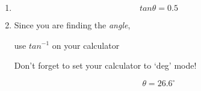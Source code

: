 {\begin{mdframed}[linewidth=4, leftmargin=40, rightmargin=40]
\begin{exercise}
\begin{enumerate}[noitemsep, label=\textbf{Step} \textbf{\arabic*}. ]
    \begin{equation}
    tan\theta =\frac{50}{100}\tag{14.15}
      \end{equation}
      \item  
      \label{m39408*id81454}\nopagebreak\noindent{}
    \begin{equation}
    tan\theta =0.5\tag{14.16}
      \end{equation}
      \item  
      \label{m39408*id81485}Since you are finding the \textsl{angle},\par 
      \label{m39408*id81494}use ${tan}^{-1}$
 on your calculator\par 
      \label{m39408*id81524}Don't forget to set your calculator to `deg' mode!\par 
      \label{m39408*id81529}\nopagebreak\noindent{}
    \begin{equation}
    \theta =26.{6}^{\circ }\tag{14.17}
      \end{equation}
      \end{enumerate}
    \end{exercise}
    \end{mdframed}
    }
